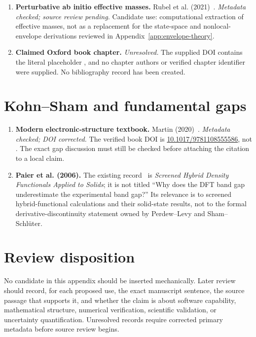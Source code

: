 \begin{enumerate}
  \item \textbf{Perturbative ab initio effective masses.}
    Rubel et al. (2021)~\cite{rubel2021effectiveMass}. \emph{Metadata checked;
    source review pending.} Candidate use: computational extraction of effective
    masses, not as a replacement for the state-space and nonlocal-envelope
    derivations reviewed in Appendix~\ref{app:envelope-theory}.

  \item \textbf{Claimed Oxford book chapter.}
    \emph{Unresolved.} The supplied DOI contains the literal placeholder
    , and no chapter authors or verified chapter identifier were
    supplied. No bibliography record has been created.
\end{enumerate}

\section{Kohn--Sham and fundamental gaps}

\begin{enumerate}
  \item \textbf{Modern electronic-structure textbook.}
    Martin (2020)~\cite{martin2020}. \emph{Metadata checked; DOI corrected.}
    The verified book DOI is
    \href{https://doi.org/10.1017/9781108555586}{10.1017/9781108555586}, not
    . The exact gap discussion must still be checked
    before attaching the citation to a local claim.

  \item \textbf{Paier et al. (2006).}
    The existing record~\cite{paier2006} is \emph{Screened Hybrid Density
    Functionals Applied to Solids}; it is not titled ``Why does the DFT band gap
    underestimate the experimental band gap?'' Its relevance is to screened
    hybrid-functional calculations and their solid-state results, not to the
    formal derivative-discontinuity statement owned by Perdew--Levy and
    Sham--Schl\"uter.
\end{enumerate}

\section{Review disposition}

No candidate in this appendix should be inserted mechanically. Later review
should record, for each proposed use, the exact manuscript sentence, the source
passage that supports it, and whether the claim is about software capability,
mathematical structure, numerical verification, scientific validation, or
uncertainty quantification. Unresolved records require corrected primary
metadata before source review begins.
